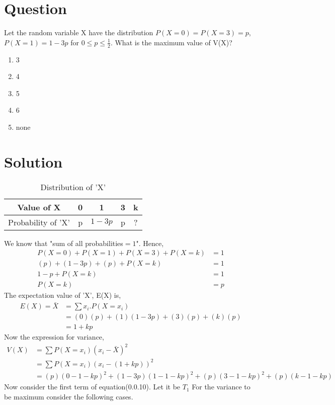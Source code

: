 \documentclass[journal,12pt,twocolumn]{IEEEtran}
\begin{document}
\section*{Question}
Let the random variable X have the distribution $P(X=0)=P(X=3)=p$, $P(X=1)=1-3p$ for $0{\leq}p{\leq}\frac{1}{2}$. What is the maximum value of V(X)?
\begin{enumerate}[label=\Alph*)]
    \item 3
    \item 4
    \item 5
    \item 6
    \item none
\end{enumerate}
\section*{Solution}
\begin{table}[h]
    \centering

       \caption{Distribution of 'X'}

    \begin{tabular}{|c|c|c|c|c|}
    \hline
        Value of X & 0 & 1 & 3 & k\\
        \hline
        Probability of 'X'& p & $1-3p$ & p & ?\\
        
        \hline
    \end{tabular}
\end{table}
We know that "sum of all probabilities$=1$". Hence,
\begin{align}
    P(X=0)+P(X=1)+P(X=3)+P(X=k) &=1 \\
    (p)+(1-3p)+(p)+P(X=k) &= 1 \\
    1-p+P(X=k) &= 1\\
    P(X=k) &=p
\end{align}
The expectation value of 'X', E(X) is,
\begin{align}
    E(X)={\bar{X}} &={\sum}x_i.P(X=x_i)\\
    &=(0)(p)+(1)(1-3p)+(3)(p)+(k)(p)\\
    &=1+kp
\end{align}
Now the expression for variance,
\begin{align}
    V(X)&={\sum}P(X=x_i)(x_i-\bar{X})^2\\
    &={\sum}P(X=x_i)(x_i-(1+kp))^2\\
    &=(p)(0-1-kp)^2+(1-3p)(1-1-kp)^2+(p)(3-1-kp)^2+(p)(k-1-kp)
\end{align}
Now consider the first term of equation(0.0.10). Let it be $T_1$ For the variance to be maximum consider the following cases.\\
\end{document}
